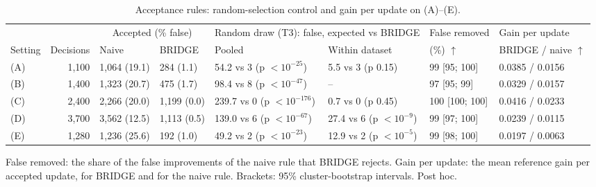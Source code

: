 \begin{table}[!t]
\centering
\scriptsize
{}
\setlength{\tabcolsep}{3pt}
\caption{Acceptance rules: random-selection control and gain per update on (A)--(E).}
\label{tab:selectivity}
\begin{tabular}{@{}lrllllll@{}}
\toprule
 & & \multicolumn{2}{c}{Accepted (\% false)} & \multicolumn{2}{c}{Random draw (T3): false, expected vs BRIDGE} & False removed & Gain per update \\
\cmidrule(lr){3-4}\cmidrule(lr){5-6}\cmidrule(l){7-7}\cmidrule(l){8-8}
Setting & Decisions & Naive & BRIDGE & Pooled & Within dataset & (\%) $\uparrow$ & BRIDGE / naive $\uparrow$ \\
\midrule
(A) & 1,100 & 1,064 (19.1) & 284 (1.1) & 54.2 vs 3 (p $<10^{-25}$) & 5.5 vs 3 (p 0.15) & 99 [95; 100] & 0.0385 / 0.0156 \\
(B) & 1,400 & 1,323 (20.7) & 475 (1.7) & 98.4 vs 8 (p $<10^{-47}$) & -- & 97 [95; 99] & 0.0329 / 0.0157 \\
(C) & 2,400 & 2,266 (20.0) & 1,199 (0.0) & 239.7 vs 0 (p $<10^{-176}$) & 0.7 vs 0 (p 0.45) & 100 [100; 100] & 0.0416 / 0.0233 \\
(D) & 3,700 & 3,562 (12.5) & 1,113 (0.5) & 139.0 vs 6 (p $<10^{-67}$) & 27.4 vs 6 (p $<10^{-9}$) & 99 [97; 100] & 0.0239 / 0.0115 \\
(E) & 1,280 & 1,236 (25.6) & 192 (1.0) & 49.2 vs 2 (p $<10^{-23}$) & 12.9 vs 2 (p $<10^{-5}$) & 99 [98; 100] & 0.0197 / 0.0063 \\
\bottomrule
\end{tabular}

\vspace{2pt}
\parbox{\linewidth}{\justifying\scriptsize *False removed: the share of the false improvements of the naive rule that BRIDGE rejects. Gain per update: the mean reference gain per accepted update, for BRIDGE and for the naive rule. Brackets: 95\% cluster-bootstrap intervals. Post hoc.}
\end{table}

